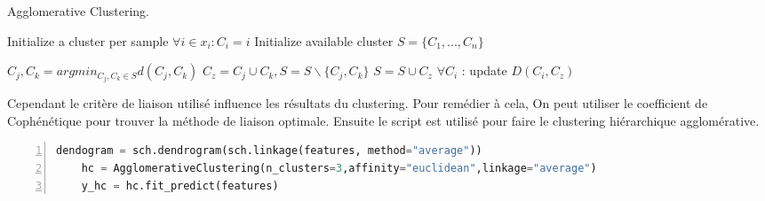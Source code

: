 \begin{algorithm}[H]
	\caption{Agglomerative Clustering.}
	\begin{algorithmic}[1]
	
		\State Initialize a cluster per sample $ \forall i \in x_{i} : C_{i} = i $
		\State Initialize available cluster $S = \{C_{1},...,C_{n}\}$
		
			\State $C_{j}, C_{k} = argmin_{C_{j},C_{k} \in S} d(C_{j}, C_{k})$  
			\State $C_{z} = C_{j} \cup C_{k}, S = S \backslash \{ C_{j},C_{k} \} $ 
				\State $S = S \cup C_{z}$
			\EndIf
			\State $\forall C_{i}$ : update $D(C_{i},C_{z})$ 
		\EndWhile 
	\EndProcedure
	
	\end{algorithmic}
\end{algorithm}

Cependant le critère de liaison utilisé influence les résultats du clustering. Pour remédier à cela, On peut utiliser le coefficient de Cophénétique pour trouver la méthode de liaison optimale. Ensuite le script est utilisé pour faire le clustering hiérarchique agglomérative.

\begin{lstlisting}[language=Python,label={pca_code}, basicstyle=\scriptsize, frame=l,framesep=4.5mm,framexleftmargin=2.5mm,tabsize=2,numbers=left,fillcolor=\color{blueforest!70},rulecolor=\color{blueforest},numberstyle=\normalfont\tiny\color{white}]
	dendogram = sch.dendrogram(sch.linkage(features, method="average"))
	hc = AgglomerativeClustering(n_clusters=3,affinity="euclidean",linkage="average")
	y_hc = hc.fit_predict(features)
\end{lstlisting}

